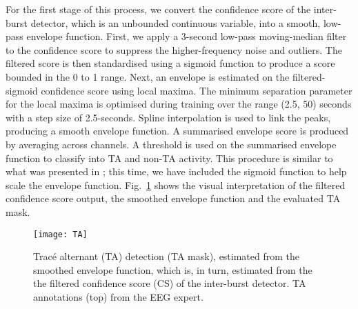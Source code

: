 \documentclass[conference]{IEEEtran}
\begin{document}
For the first stage of this process, we convert the confidence score of the inter-burst detector, which is an unbounded continuous variable, into a smooth, low-pass envelope function. 
First, we apply a 3-second low-pass moving-median filter to the confidence score to suppress the higher-frequency noise and outliers. The filtered score is then standardised using a sigmoid function to produce a score bounded in the 0 to 1 range. %
Next, an envelope is estimated on the filtered-sigmoid confidence score using local maxima. 
The minimum separation parameter for the local maxima is optimised during training over the range (2.5, 50) seconds with a step size of 2.5-seconds.
Spline interpolation is used to link the peaks, producing a smooth envelope function. A summarised envelope score is produced by averaging across channels. A threshold is used on the summarised envelope function to classify into TA and non-TA activity.
This procedure is similar to what was presented in \cite{raurale2020ta}; this time, we have included the sigmoid function to help scale the envelope function.
Fig.~\ref{fig_ta} shows the visual interpretation of the filtered confidence score output, the smoothed envelope function and the evaluated TA mask. 

\begin{figure}[!h]
	\centering
	\texttt{[image: TA]}
	\caption{Trac\'e alternant (TA) detection (TA mask), estimated from the smoothed envelope function, which is, in turn, estimated from the the filtered confidence score (CS) of the inter-burst detector. TA annotations (top) from the EEG expert.}
	\label{fig_ta}
\end{figure}
\end{document}
